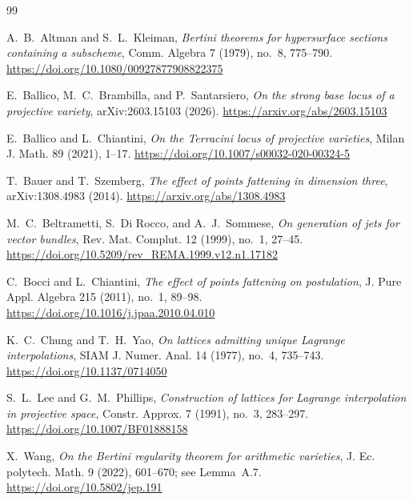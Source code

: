 \documentclass[11pt]{article}
\begin{document}
\begin{thebibliography}{99}

A.~B.~Altman and S.~L.~Kleiman,
\emph{Bertini theorems for hypersurface sections containing a subscheme},
Comm. Algebra 7 (1979), no.~8, 775--790.
\url{https://doi.org/10.1080/00927877908822375}

E.~Ballico, M.~C.~Brambilla, and P.~Santarsiero,
\emph{On the strong base locus of a projective variety},
arXiv:2603.15103 (2026).
\url{https://arxiv.org/abs/2603.15103}

E.~Ballico and L.~Chiantini,
\emph{On the Terracini locus of projective varieties},
Milan J. Math. 89 (2021), 1--17.
\url{https://doi.org/10.1007/s00032-020-00324-5}

T.~Bauer and T.~Szemberg,
\emph{The effect of points fattening in dimension three},
arXiv:1308.4983 (2014).
\url{https://arxiv.org/abs/1308.4983}

M.~C.~Beltrametti, S.~Di Rocco, and A.~J.~Sommese,
\emph{On generation of jets for vector bundles},
Rev. Mat. Complut. 12 (1999), no.~1, 27--45.
\url{https://doi.org/10.5209/rev_REMA.1999.v12.n1.17182}

C.~Bocci and L.~Chiantini,
\emph{The effect of points fattening on postulation},
J. Pure Appl. Algebra 215 (2011), no.~1, 89--98.
\url{https://doi.org/10.1016/j.jpaa.2010.04.010}

K.~C.~Chung and T.~H.~Yao,
\emph{On lattices admitting unique Lagrange interpolations},
SIAM J. Numer. Anal. 14 (1977), no.~4, 735--743.
\url{https://doi.org/10.1137/0714050}

S.~L.~Lee and G.~M.~Phillips,
\emph{Construction of lattices for Lagrange interpolation in projective space},
Constr. Approx. 7 (1991), no.~3, 283--297.
\url{https://doi.org/10.1007/BF01888158}

X.~Wang,
\emph{On the Bertini regularity theorem for arithmetic varieties},
J. Ec. polytech. Math. 9 (2022), 601--670; see Lemma~A.7.
\url{https://doi.org/10.5802/jep.191}

\end{thebibliography}
\end{document}
